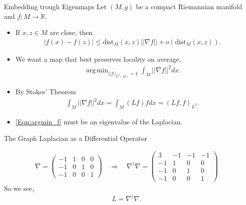 \documentclass[11pt]{beamer}
\DeclareMathOperator*{\argmin}{arg\,min}
\begin{document}
\begin{frame}{Embedding trough Eigenmaps}
Let $(M, g)$ be a compact Riemannian manifold and $f:M\longrightarrow \mathbb{R}$. 
\begin{itemize}
\item If $x, z\in M$ are close, then
\begin{align*}
|f(x)-f(z)| \leq \text{dist}_M(x,z) ||\nabla f||+o(\text{dist}_M(x,z)).
\end{align*}
\pause
\item We want a map that best preserves locality on average,
\begin{align}\label{Eqn:argmin_f}
\argmin_{||f||_{L^2(M)}=1}\int_M ||\nabla f||^2 dx.
\end{align}
\pause
\item By Stokes' Theorem
\begin{align*}
\int_M ||\nabla f||^2 dx = \int_M (Lf)f dx = (Lf,f)_{L^2}.
\end{align*}
\item \eqref{Eqn:argmin_f} must be an eigenvalue of the Laplacian. 
\end{itemize}
\end{frame}

\begin{frame}{The Graph Laplacian as a Differential Operator}
\begin{figure}[h]
\begin{center}
\end{center}
\end{figure}
\begin{align*}
\nabla = \left(
\begin{array}{cccc}
 -1 & 1 & 0 & 0 \\
 -1 & 0 & 1 & 0 \\
 -1 & 0 & 0 & 1
\end{array}
\right)
\quad 
\Rightarrow
\quad 
\nabla^\dagger \nabla = \left(
\begin{array}{cccc}
 3 & -1 & -1 & -1 \\
 -1 & 1 & 0 & 0 \\
 -1 & 0 & 1 & 0 \\
 -1 & 0 & 0 & 1 
\end{array}
\right)
\end{align*}
So we see, 
\begin{align*}
L = \nabla^\dagger \nabla. 
\end{align*}
\end{frame}
\end{document}
